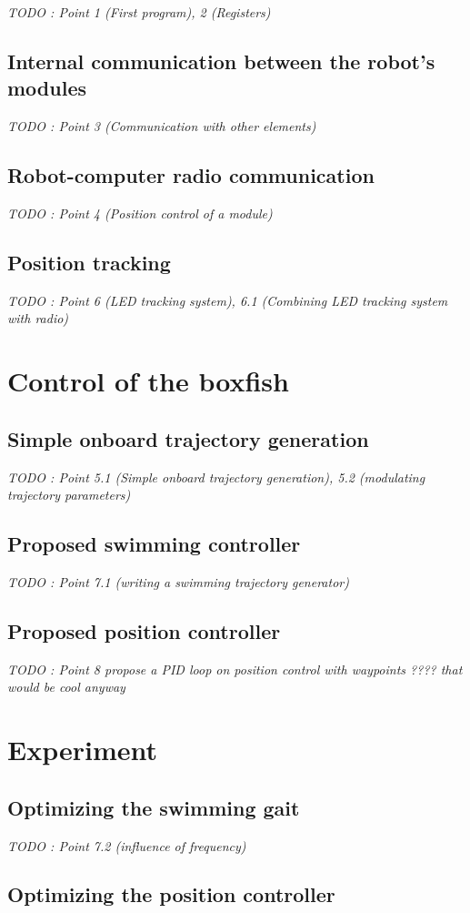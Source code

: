 \documentclass[11pt]{article}
\begin{document}
\textit{TODO : Point 1 (First program), 2 (Registers)}

\subsection{Internal communication between the robot's modules}

\textit{TODO : Point 3 (Communication with other elements)}

\subsection{Robot-computer radio communication}

\textit{TODO : Point 4 (Position control of a module)}

\subsection{Position tracking}

\textit{TODO : Point 6 (LED tracking system), 6.1 (Combining LED tracking system with radio)}

\section{Control of the boxfish}

\subsection{Simple onboard trajectory generation}

\textit{TODO : Point 5.1 (Simple onboard trajectory generation), 5.2 (modulating trajectory parameters)}

\subsection{Proposed swimming controller}

\textit{TODO : Point 7.1 (writing a swimming trajectory generator)}

\subsection{Proposed position controller}

\textit{TODO : Point 8 propose a PID loop on position control with waypoints ???? that would be cool anyway}

\section{Experiment}

\subsection{Optimizing the swimming gait}

\textit{TODO : Point 7.2 (influence of frequency)}

\subsection{Optimizing the position controller}

\printbibliography %
\end{document}

